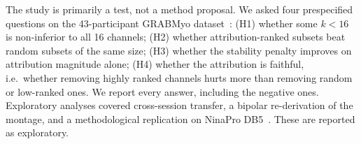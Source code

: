 The study is primarily a test, not a method proposal. We asked four prespecified questions on the 43-participant GRABMyo dataset~\cite{pradhan2022multiday}:
(H1) whether some $k < 16$ is non-inferior to all 16 channels;
(H2) whether attribution-ranked subsets beat random subsets of the same size;
(H3) whether the stability penalty improves on attribution magnitude alone;
(H4) whether the attribution is faithful, i.e.\ whether removing highly ranked channels hurts more than removing random or low-ranked ones.
We report every answer, including the negative ones. Exploratory analyses covered cross-session transfer, a bipolar re-derivation of the montage, and a methodological replication on NinaPro DB5~\cite{pizzolato2017comparison}. These are reported as exploratory.
